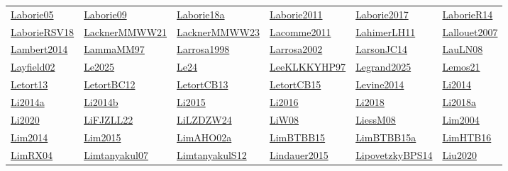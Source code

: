 \begin{longtable}{*{6}{l}}
\hyperref[detail:Laborie05]{Laborie05} & \hyperref[detail:Laborie09]{Laborie09} & \hyperref[detail:Laborie18a]{Laborie18a} & \hyperref[detail:Laborie2011]{Laborie2011} & \hyperref[detail:Laborie2017]{Laborie2017} & \hyperref[detail:LaborieR14]{LaborieR14}\\ 
\hyperref[detail:LaborieRSV18]{LaborieRSV18} & \hyperref[detail:LacknerMMWW21]{LacknerMMWW21} & \hyperref[detail:LacknerMMWW23]{LacknerMMWW23} & \hyperref[detail:Lacomme2011]{Lacomme2011} & \hyperref[detail:LahimerLH11]{LahimerLH11} & \hyperref[detail:Lallouet2007]{Lallouet2007}\\ 
\hyperref[detail:Lambert2014]{Lambert2014} & \hyperref[detail:LammaMM97]{LammaMM97} & \hyperref[detail:Larrosa1998]{Larrosa1998} & \hyperref[detail:Larrosa2002]{Larrosa2002} & \hyperref[detail:LarsonJC14]{LarsonJC14} & \hyperref[detail:LauLN08]{LauLN08}\\ 
\hyperref[detail:Layfield02]{Layfield02} & \hyperref[detail:Le2025]{Le2025} & \hyperref[detail:Le24]{Le24} & \hyperref[detail:LeeKLKKYHP97]{LeeKLKKYHP97} & \hyperref[detail:Legrand2025]{Legrand2025} & \hyperref[detail:Lemos21]{Lemos21}\\ 
\hyperref[detail:Letort13]{Letort13} & \hyperref[detail:LetortBC12]{LetortBC12} & \hyperref[detail:LetortCB13]{LetortCB13} & \hyperref[detail:LetortCB15]{LetortCB15} & \hyperref[detail:Levine2014]{Levine2014} & \hyperref[detail:Li2014]{Li2014}\\ 
\hyperref[detail:Li2014a]{Li2014a} & \hyperref[detail:Li2014b]{Li2014b} & \hyperref[detail:Li2015]{Li2015} & \hyperref[detail:Li2016]{Li2016} & \hyperref[detail:Li2018]{Li2018} & \hyperref[detail:Li2018a]{Li2018a}\\ 
\hyperref[detail:Li2020]{Li2020} & \hyperref[detail:LiFJZLL22]{LiFJZLL22} & \hyperref[detail:LiLZDZW24]{LiLZDZW24} & \hyperref[detail:LiW08]{LiW08} & \hyperref[detail:LiessM08]{LiessM08} & \hyperref[detail:Lim2004]{Lim2004}\\ 
\hyperref[detail:Lim2014]{Lim2014} & \hyperref[detail:Lim2015]{Lim2015} & \hyperref[detail:LimAHO02a]{LimAHO02a} & \hyperref[detail:LimBTBB15]{LimBTBB15} & \hyperref[detail:LimBTBB15a]{LimBTBB15a} & \hyperref[detail:LimHTB16]{LimHTB16}\\ 
\hyperref[detail:LimRX04]{LimRX04} & \hyperref[detail:Limtanyakul07]{Limtanyakul07} & \hyperref[detail:LimtanyakulS12]{LimtanyakulS12} & \hyperref[detail:Lindauer2015]{Lindauer2015} & \hyperref[detail:LipovetzkyBPS14]{LipovetzkyBPS14} & \hyperref[detail:Liu2020]{Liu2020}\\ 

\end{longtable}
